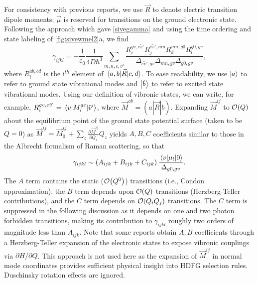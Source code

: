 \documentclass[aip, jcp, reprint, onecolumn, nofootinbib]{revtex4-2}
\begin{document}
For consistency with previous reports, we use $\vec{R}$ to denote electric transition dipole moments; $\vec{\mu}$ is reserved for transitions on the ground electronic state. \cite{Tang1970}
Following the approach which gave \autoref{sivegamma} and using the time ordering and state labeling of \autoref{fig:sivewmel2}a, we find
\begin{equation}\label{drgamma_notaylor}
	\gamma_{ijkl} = -\frac{1}{\varepsilon_0} \frac{1}{4D \hbar^3} \sum_{m,n,e,\tilde{v}'} \frac{
		R_{i}^{gv, e\tilde{v}'} 
		R_{j}^{e\tilde{v}',mn} 
		R_{k}^{mn,g0} 
		R_{l}^{g0,gv} 
	}{	\Delta_{e\tilde{v}', gv}
		\Delta_{mn, gv}
		\Delta_{g0,gv}
	},
\end{equation}
where $R_{i}^{ab,cd}$ is the i$^{th}$ element of $\mel{a,b}{\vec{R}}{c,d}$.
To ease readability, we use $\ket{a}$ to refer to ground state vibrational modes and $\ket{\tilde{b}}$ to refer to excited state vibrational modes.
Using our definition of vibronic states, we can write, for example,
$R_{i}^{gv,e\tilde{v}'} = \mel{v}{M_i^{ge}}{\tilde{v}'}$, where $\vec{M}^{ab} = (a|\vec{R}|b)$.\cite{Ziegler1974}
Expanding $\vec{M}^{ij}$ to $\order{Q}$ about the equilibrium point of the ground state potential surface (taken to be $Q = 0$) as
$\vec{M}^{ij} = \vec{M}^{ij}_0 + \sum_z \frac{\partial\vec{M}^{ij}}{\partial Q_z} Q_z$
yields $A, B, C$ coefficients similar to those in the Albrecht formalism of Raman scattering, \cite{Albrecht1961, Warshel1977, Ziegler1988} so that
\begin{equation}\label{gammaabc}
		\gamma_{ijkl} \sim \left(A_{ijk} + B_{ijk} + C_{ijk}\right) \frac{\mel{v}{\mu_{l}}{0}} {\Delta_{g0,gv}}.
\end{equation}
The $A$ term contains the static ($\order{Q^0}$) transitions (i.e., Condon approximation),\cite{Condon1928} the $B$ term depends upon $\order{Q}$ transitions (Herzberg-Teller contributions),\cite{HerzbergTeller1933} and the $C$ term depends on $\order{Q_i Q_j}$ transitions. 
The $C$ term is suppressed in the following discussion as it depends on one and two photon forbidden transitions, making its contribution to $\gamma_{ijkl}$ roughly two orders of magnitude less than $A_{ijk}$. \cite{Ziegler1988, Neddersen1989, Bonang1992}
Note that some reports obtain $A, B$ coefficients through a Herzberg-Teller expansion of the electronic states to expose vibronic couplings via $\partial H / \partial Q$.\cite{HerzbergTeller1933, Petrov1985, Neddersen1989, Baranov1990}
This approach is not used here as the expansion of $\vec{M}^{ij}$ in normal mode coordinates provides sufficient physical insight into HDFG selection rules. 
Duschinsky rotation effects\cite{Duschinsky1937} are ignored.
\end{document}
